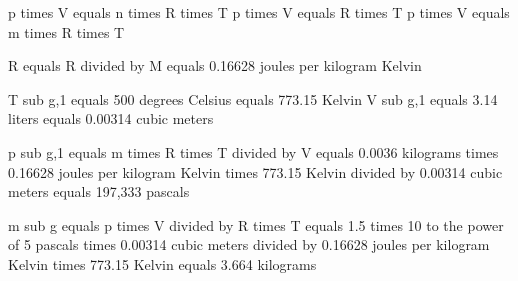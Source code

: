 p times V equals n times R times T  
p times V equals R times T  
p times V equals m times R times T  

R equals R divided by M equals 0.16628 joules per kilogram Kelvin  

T sub g,1 equals 500 degrees Celsius equals 773.15 Kelvin  
V sub g,1 equals 3.14 liters equals 0.00314 cubic meters  

p sub g,1 equals m times R times T divided by V equals 0.0036 kilograms times 0.16628 joules per kilogram Kelvin times 773.15 Kelvin divided by 0.00314 cubic meters equals 197,333 pascals  

m sub g equals p times V divided by R times T equals 1.5 times 10 to the power of 5 pascals times 0.00314 cubic meters divided by 0.16628 joules per kilogram Kelvin times 773.15 Kelvin equals 3.664 kilograms